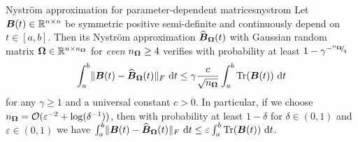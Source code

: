 \documentclass[12pt]{article}
\begin{document}
\begin{lemma}{Nyström approximation for parameter-dependent matrices}{nystrom}
    Let $\boldsymbol{B}(t) \in \mathbb{R}^{n \times n}$ be symmetric positive semi-definite and continuously depend on $t \in [a, b]$. Then its Nyström approximation $\widehat{\boldsymbol{B}}_{\boldsymbol{\Omega}}(t)$ with Gaussian random matrix $\boldsymbol{\Omega} \in \mathbb{R}^{n \times n_{\boldsymbol{\Omega}}}$ for \emph{even} $n_{\boldsymbol{\Omega}} \geq 4$ verifies with probability at least $1 - \gamma^{-{}^{n_{\boldsymbol{\Omega}}}{\mskip -5mu/\mskip -3mu}_{4}}$
    \begin{equation}
        \int_{a}^{b} \lVert \boldsymbol{B}(t) - \widehat{\boldsymbol{B}}_{\boldsymbol{\Omega}}(t) \rVert _F~\mathrm{d}t \leq \gamma \frac{c}{\sqrt{n_{\boldsymbol{\Omega}}}} \int_{a}^{b} \operatorname{Tr}(\boldsymbol{B}(t))~\mathrm{d}t
        \label{qu:nystrompp-theorem-bound}
    \end{equation}
    for any $\gamma \geq 1$ and a universal constant $c > 0$. In particular, if we choose $n_{\boldsymbol{\Omega}} = \mathcal{O}(\varepsilon^{-2} + \log(\delta^{-1}))$, then with probability at least $1-\delta$ for $\delta \in (0, 1)$ and $\varepsilon \in (0, 1)$ we have $\int_{a}^{b} \lVert \boldsymbol{B}(t) - \widehat{\boldsymbol{B}}_{\boldsymbol{\Omega}}(t) \rVert _F~\mathrm{d}t \leq \varepsilon \int_{a}^{b} \operatorname{Tr}(\boldsymbol{B}(t))~\mathrm{d}t$.
\end{lemma}

\end{document}
